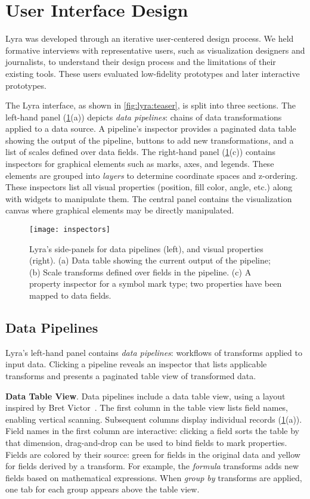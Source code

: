 \section{User Interface Design}

Lyra was developed through an iterative user-centered design process. We held
formative interviews with representative users, such as visualization designers
and journalists, to understand their design process and the limitations of their
existing tools. These users evaluated low-fidelity prototypes and later
interactive prototypes.

The Lyra interface, as shown in \cref{fig:lyra:teaser}, is split into three
sections. The left-hand panel (\cref{fig:lyra:inspectors}(a)) depicts \emph{data
pipelines}: chains of data transformations applied to a data source. A
pipeline's inspector provides a paginated data table showing the output of the
pipeline, buttons to add new transformations, and a list of scales defined over
data fields. The right-hand panel (\cref{fig:lyra:inspectors}(c)) contains
inspectors for graphical elements such as marks, axes, and legends. These
elements are grouped into \emph{layers} to determine coordinate spaces and
z-ordering. These inspectors list all visual properties (position, fill color,
angle, etc.) along with widgets to manipulate them. The central panel contains
the visualization canvas where graphical elements may be directly manipulated.

\begin{figure}[t!]
\texttt{[image: inspectors]}
\caption{Lyra's side-panels for data pipelines (left), and
visual properties (right). (a) Data table showing the current output
of the pipeline; (b) Scale transforms defined over fields in the pipeline.
(c) A property inspector for a symbol mark type; two properties have been
mapped to data fields.}
\label{fig:lyra:inspectors}
\end{figure}

\subsection{Data Pipelines}

Lyra's left-hand panel contains \emph{data pipelines}: workflows of transforms
applied to input data. Clicking a pipeline reveals an inspector that lists
applicable transforms and presents a paginated table view of transformed data.

\textbf{Data Table View}. Data pipelines include a data table view, using a
layout inspired by Bret Victor~\cite{victor:drawing}. The first column in the
table view lists field names, enabling vertical scanning. Subsequent columns
display individual records (\cref{fig:lyra:inspectors}(a)). Field names in the
first column are interactive: clicking a field sorts the table by that
dimension, drag-and-drop can be used to bind fields to mark properties. Fields
are colored by their source: green for fields in the original data and yellow
for fields derived by a transform. For example, the \emph{formula} transforms
adds new fields based on mathematical expressions. When \emph{group by}
transforms are applied, one tab for each group appears above the table view.

